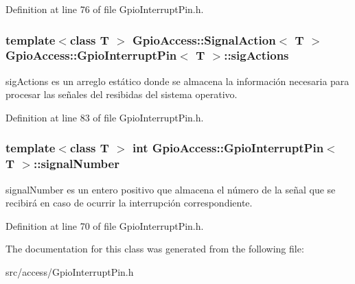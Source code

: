\-Definition at line 76 of file \-Gpio\-Interrupt\-Pin.\-h.

\hypertarget{class_gpio_access_1_1_gpio_interrupt_pin_a71835f78bf46796ca311b4357bee2d68}{
\subsubsection[{sig\-Actions}]{\setlength{\rightskip}{0pt plus 5cm}template$<$class T $>$ {\bf \-Gpio\-Access\-::\-Signal\-Action}$<$ \-T $>$ {\bf \-Gpio\-Access\-::\-Gpio\-Interrupt\-Pin}$<$ \-T $>$\-::{\bf sig\-Actions}}}\label{class_gpio_access_1_1_gpio_interrupt_pin_a71835f78bf46796ca311b4357bee2d68}
sig\-Actions es un arreglo estático donde se almacena la información necesaria para procesar las señales del resibidas del sistema operativo. 

\-Definition at line 83 of file \-Gpio\-Interrupt\-Pin.\-h.

\hypertarget{class_gpio_access_1_1_gpio_interrupt_pin_a1f41ac0250370704c82e2ef827ad55d0}{
\subsubsection[{signal\-Number}]{\setlength{\rightskip}{0pt plus 5cm}template$<$class T $>$ int {\bf \-Gpio\-Access\-::\-Gpio\-Interrupt\-Pin}$<$ \-T $>$\-::{\bf signal\-Number}}}\label{class_gpio_access_1_1_gpio_interrupt_pin_a1f41ac0250370704c82e2ef827ad55d0}
signal\-Number es un entero positivo que almacena el número de la señal que se recibirá en caso de ocurrir la interrupción correspondiente. 

\-Definition at line 70 of file \-Gpio\-Interrupt\-Pin.\-h.



\-The documentation for this class was generated from the following file\-:\begin{DoxyCompactItemize}
\item 
src/access/\-Gpio\-Interrupt\-Pin.\-h\end{DoxyCompactItemize}

